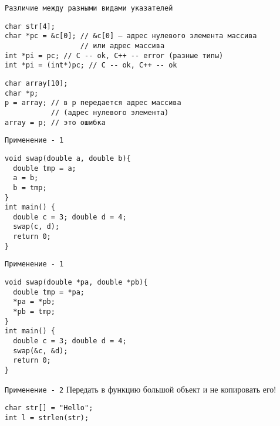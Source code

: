 \documentclass[pdf, 10pt, unicode]{beamer}
\begin{document}
\begin{frame}[fragile]{{\tt Различие между разными видами указателей}}
\begin{verbatim}
char str[4];
char *pc = &c[0]; // &c[0] – адрес нулевого элемента массива
                  // или адрес массива
int *pi = pc; // C -- ok, C++ -- error (разные типы)
int *pi = (int*)pc; // C -- ok, C++ -- ok
\end{verbatim}

\begin{verbatim}
char array[10];
char *p;
p = array; // в p передается адрес массива
           // (адрес нулевого элемента)
array = p; // это ошибка
\end{verbatim}
\end{frame}

\begin{frame}[fragile]{{\tt Применение - 1}}
\begin{verbatim}
void swap(double a, double b){
  double tmp = a;
  a = b;
  b = tmp;
}
int main() {
  double c = 3; double d = 4;
  swap(c, d);
  return 0;
}
\end{verbatim}
\begin{enumerate}
\end{enumerate}

\end{frame}

\begin{frame}[fragile]{{\tt Применение - 1}}
\begin{verbatim}
void swap(double *pa, double *pb){
  double tmp = *pa;
  *pa = *pb;
  *pb = tmp;
}
int main() {
  double c = 3; double d = 4;
  swap(&c, &d);
  return 0;
}
\end{verbatim}

\end{frame}

\begin{frame}[fragile]{{\tt Применение - 2}}
Передать в функцию большой объект и не копировать его!
\begin{verbatim}
char str[] = "Hello";
int l = strlen(str);
\end{verbatim}

\end{frame}
\end{document}
